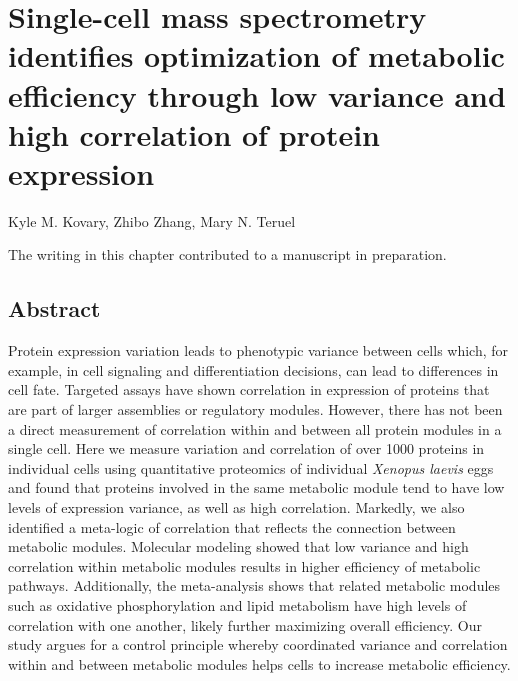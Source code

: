 \chapter{Single-cell mass spectrometry identifies optimization of metabolic efficiency through low variance and high correlation of protein expression}

\begin{center}
Kyle M. Kovary, Zhibo Zhang, Mary N. Teruel
\end{center}

\vspace*{\fill}

\begin{flushleft}
The writing in this chapter contributed to a manuscript in preparation.
\end{flushleft}

\newpage

\section{Abstract}
Protein expression variation leads to phenotypic variance between cells which, for example, in cell signaling and differentiation decisions, can lead to differences in cell fate. Targeted assays have shown correlation in expression of proteins that are part of larger assemblies or regulatory modules. However, there has not been a direct measurement of correlation within and between all protein modules in a single cell. Here we measure variation and correlation of over 1000 proteins in individual cells using quantitative proteomics of individual \emph{Xenopus laevis} eggs and found that proteins involved in the same metabolic module tend to have low levels of expression variance, as well as high correlation. Markedly, we also identified a meta-logic of correlation that reflects the connection between metabolic modules. Molecular modeling showed that low variance and high correlation within metabolic modules results in higher efficiency of metabolic pathways. Additionally, the meta-analysis shows that related metabolic modules such as oxidative phosphorylation and lipid metabolism have high levels of correlation with one another, likely further maximizing overall efficiency. Our study argues for a control principle whereby coordinated variance and correlation within and between metabolic modules helps cells to increase metabolic efficiency.

